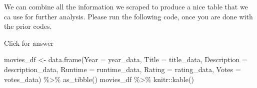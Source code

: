 \documentclass[
]{book}
\newenvironment{Shaded}{\begin{snugshade}}{\end{snugshade}}
\newcommand{\AttributeTok}[1]{\textcolor[rgb]{0.77,0.63,0.00}{#1}}
\newcommand{\FunctionTok}[1]{\textcolor[rgb]{0.00,0.00,0.00}{#1}}
\newcommand{\NormalTok}[1]{#1}
\newcommand{\OtherTok}[1]{\textcolor[rgb]{0.56,0.35,0.01}{#1}}
\newcommand{\SpecialCharTok}[1]{\textcolor[rgb]{0.00,0.00,0.00}{#1}}
\begin{document}
We can combine all the information we scraped to produce a nice table that we ca use for further analysis. Please run the following code, once you are done with the prior codes.

Click for answer

\begin{Shaded}
\begin{Highlighting}[]
\NormalTok{movies\_df }\OtherTok{\textless{}{-}} \FunctionTok{data.frame}\NormalTok{(}\AttributeTok{Year =}\NormalTok{ year\_data,}
                      \AttributeTok{Title =}\NormalTok{ title\_data,}
                      \AttributeTok{Description =}\NormalTok{ description\_data, }
                      \AttributeTok{Runtime =}\NormalTok{ runtime\_data,}
                      \AttributeTok{Rating =}\NormalTok{ rating\_data,}
                      \AttributeTok{Votes =}\NormalTok{ votes\_data) }\SpecialCharTok{\%\textgreater{}\%} \FunctionTok{as\_tibble}\NormalTok{()}
\NormalTok{movies\_df }\SpecialCharTok{\%\textgreater{}\%}\NormalTok{ knitr}\SpecialCharTok{::}\FunctionTok{kable}\NormalTok{()}
\end{Highlighting}
\end{Shaded}
\end{document}
